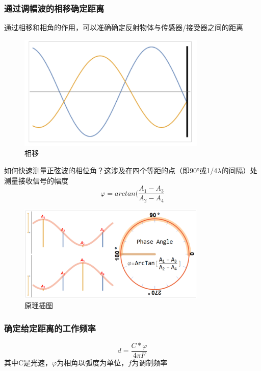 \documentclass[UTF8]{ctexart}
\begin{document}
\subsubsection{通过调幅波的相移确定距离}
通过相移和相角的作用，可以准确确定反射物体与传感器/接受器之间的距离
\begin{figure}
	\centering
	\includegraphics[width=0.8\textwidth]{相移.png}
	\caption{相移}
\end{figure}
如何快速测量正弦波的相位角？这涉及在四个等距的点（即90°或1/4$\lambda$的间隔）处测量接收信号的幅度
$$\varphi=arctan(\frac{A_1-A_3}{A_2-A_4}$$
\begin{figure}
	\centering
	\includegraphics[width=0.8\textwidth]{原理插图.png}
	\caption{原理插图}
\end{figure}
\subsubsection{确定给定距离的工作频率}
$$d=\frac{C*\varphi}{4\pi F}$$
其中C是光速，$ \varphi$为相角以弧度为单位，$f$为调制频率
\end{document}
